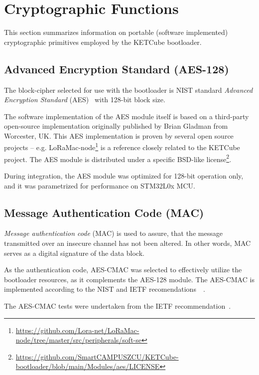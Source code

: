 \clearpage
\section{Cryptographic Functions}
This section summarizes information on portable (software implemented) cryptographic primitives employed by the KETCube bootloader.

\subsection{Advanced Encryption Standard (AES-128)}

The block-cipher selected for use with the bootloader is NIST standard \textit{Advanced Encryption Standard} (AES)~\cite{NIST:AES} with 128-bit block size. 

The software implementation of the AES module itself is based on a third-party open-source implementation originally published by Brian Gladman from Worcester, UK.  This AES implementation is proven by several open source projects -- e.g. LoRaMac-node\footnote{\url{https://github.com/Lora-net/LoRaMac-node/tree/master/src/peripherals/soft-se}} is a reference closely related to the KETCube project. The AES module is distributed under a specific BSD-like license\footnote{\url{https://github.com/SmartCAMPUSZCU/KETCube-bootloader/blob/main/Modules/aes/LICENSE}}.

During integration, the AES module was optimized for 128-bit operation only, and it was parametrized for performance on STM32L0x MCU.



\subsection{Message Authentication Code (MAC)}

\textit{Message authentication code} (MAC) is used to assure, that the message transmitted over an insecure channel has not been altered. In other words, MAC serves as a digital signature of the data block.

As the authentication code, AES-CMAC was selected to effectively utilize the bootloader resources, as it complements the AES-128 module. The AES-CMAC is implemented according to the NIST and IETF recomendations~\cite{NIST:AES-CMAC}~\cite{IETF:AES-CMAC}. 

The AES-CMAC tests were undertaken from the IETF recommendation~\cite{IETF:AES-CMAC}.

